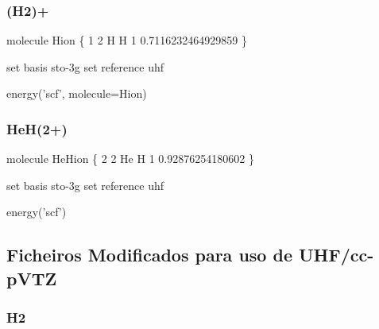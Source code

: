 \documentclass[portuguese,]{article}
\newenvironment{Shaded}{}{}
\newcommand{\BuiltInTok}[1]{#1}
\newcommand{\DecValTok}[1]{\textcolor[rgb]{0.25,0.63,0.44}{#1}}
\newcommand{\FloatTok}[1]{\textcolor[rgb]{0.25,0.63,0.44}{#1}}
\newcommand{\NormalTok}[1]{#1}
\newcommand{\OperatorTok}[1]{\textcolor[rgb]{0.40,0.40,0.40}{#1}}
\newcommand{\StringTok}[1]{\textcolor[rgb]{0.25,0.44,0.63}{#1}}
\begin{document}
\label{code:ioninp}

\hypertarget{h2-1}{%
\subsubsection{(H2)+}\label{h2-1}}

\begin{Shaded}
\begin{Highlighting}[]
\NormalTok{molecule Hion \{}
    \DecValTok{1} \DecValTok{2}
\NormalTok{    H}
\NormalTok{    H }\DecValTok{1} \FloatTok{0.7116232464929859}
\NormalTok{\}}

\BuiltInTok{set}\NormalTok{ basis sto}\OperatorTok{-}\NormalTok{3g}
\BuiltInTok{set}\NormalTok{ reference uhf}

\NormalTok{energy(}\StringTok{'scf'}\NormalTok{, molecule}\OperatorTok{=}\NormalTok{Hion)}
\end{Highlighting}
\end{Shaded}

\hypertarget{heh2}{%
\subsubsection{HeH(2+)}\label{heh2}}

\begin{Shaded}
\begin{Highlighting}[]
\NormalTok{molecule HeHion \{}
    \DecValTok{2} \DecValTok{2}
\NormalTok{    He}
\NormalTok{    H }\DecValTok{1} \FloatTok{0.92876254180602}
\NormalTok{\}}

\BuiltInTok{set}\NormalTok{ basis sto}\OperatorTok{-}\NormalTok{3g}
\BuiltInTok{set}\NormalTok{ reference uhf}

\NormalTok{energy(}\StringTok{'scf'}\NormalTok{)}
\end{Highlighting}
\end{Shaded}

\hypertarget{ficheiros-modificados-para-uso-de-uhfcc-pvtz}{%
\subsection{Ficheiros Modificados para uso de
UHF/cc-pVTZ}\label{ficheiros-modificados-para-uso-de-uhfcc-pvtz}}

\label{code:ccpvtz}

\hypertarget{h2-2}{%
\subsubsection{H2}\label{h2-2}}
\end{document}
